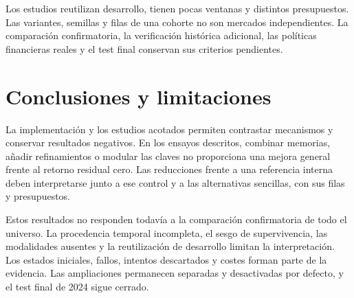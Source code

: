 \documentclass[11pt,a4paper]{report}
\begin{document}
Los estudios reutilizan desarrollo, tienen pocas ventanas y distintos
presupuestos. Las variantes, semillas y filas de una cohorte no son mercados
independientes. La comparación confirmatoria, la verificación histórica
adicional, las políticas financieras reales y el test final conservan sus
criterios pendientes.

\chapter{Conclusiones y limitaciones}
La implementación y los estudios acotados permiten contrastar mecanismos y
conservar resultados negativos. En los ensayos descritos, combinar memorias,
añadir refinamientos o modular las claves no proporciona una mejora general
frente al retorno residual cero. Las reducciones frente a una referencia
interna deben interpretarse junto a ese control y a las alternativas
sencillas, con sus filas y presupuestos.

Estos resultados no responden todavía a la comparación confirmatoria de todo
el universo. La procedencia temporal incompleta, el sesgo de supervivencia,
las modalidades ausentes y la reutilización de desarrollo limitan la
interpretación. Los estados iniciales, fallos, intentos descartados y costes
forman parte de la evidencia. Las ampliaciones permanecen separadas y
desactivadas por defecto, y el test final de 2024 sigue cerrado.

\printbibliography
\end{document}
